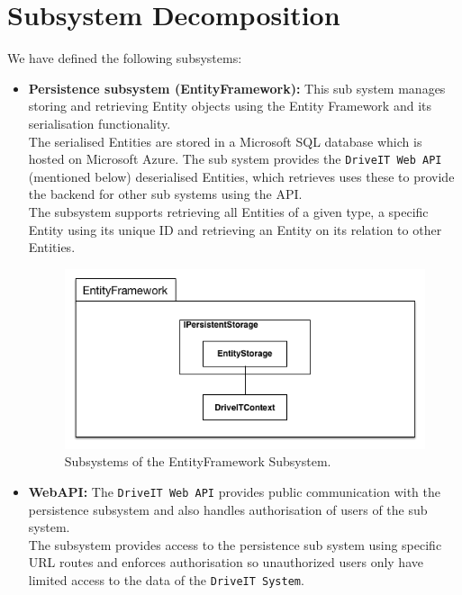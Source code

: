 \section{Subsystem Decomposition}
We have defined the following subsystems:
\begin{itemize}
	\item \textbf{Persistence subsystem (EntityFramework):} This sub system manages storing and retrieving Entity objects using the Entity Framework and its serialisation functionality.\\
	The serialised Entities are stored in a Microsoft SQL database which is hosted on Microsoft Azure. The sub system provides the \texttt{DriveIT Web API} (mentioned below) deserialised Entities, which retrieves uses these to provide the backend for other sub systems using the API.\\
	The subsystem supports retrieving all Entities of a given type, a specific Entity using its unique ID and retrieving an Entity on its relation to other Entities. 
	\begin{figure}[h!]
		\centering
		\includegraphics[scale=0.30]{Figures/EntityFrameworkSubsystemDecomposition}
		\caption{Subsystems of the EntityFramework Subsystem.}
	\end{figure}
	\item \textbf{WebAPI:} The \texttt{DriveIT Web API} provides public communication with the persistence subsystem and also handles authorisation of users of the sub system.\\
	The subsystem provides access to the persistence sub system using specific URL routes and enforces authorisation so unauthorized users only have limited access to the data of the \texttt{DriveIT System}.\\ 

\end{itemize}
